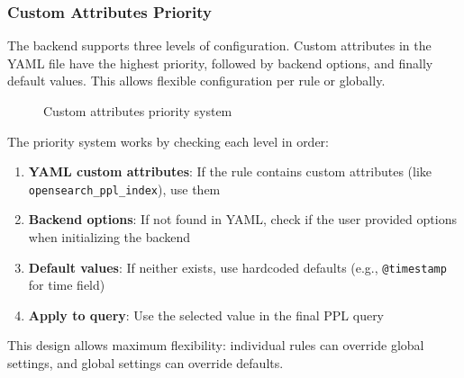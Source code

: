 \subsubsection{Custom Attributes Priority}

The backend supports three levels of configuration. Custom attributes in the YAML file have the highest priority, followed by backend options, and finally default values. This allows flexible configuration per rule or globally.

\begin{figure}[htbp]
\centering
{}
\caption{Custom attributes priority system}
\label{fig:custom_attrs_flow}
\end{figure}

The priority system works by checking each level in order:
\begin{enumerate}
    \item \textbf{YAML custom attributes}: If the rule contains custom attributes (like \texttt{opensearch\_ppl\_index}), use them
    \item \textbf{Backend options}: If not found in YAML, check if the user provided options when initializing the backend
    \item \textbf{Default values}: If neither exists, use hardcoded defaults (e.g., \texttt{@timestamp} for time field)
    \item \textbf{Apply to query}: Use the selected value in the final PPL query
\end{enumerate}

This design allows maximum flexibility: individual rules can override global settings, and global settings can override defaults.
